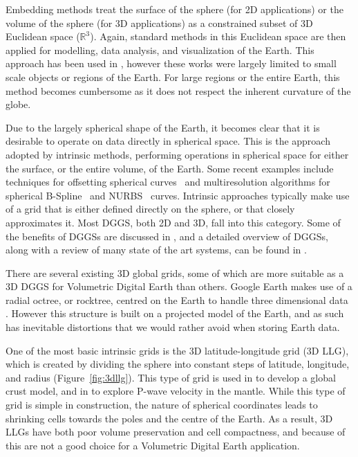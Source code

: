Embedding methods treat the surface of the sphere (for 2D applications) or the volume of the sphere (for 3D applications) as a constrained subset of 3D Euclidean space ($\mathbb{R}^{3}$). Again, standard methods in this Euclidean space are then applied for modelling, data analysis, and visualization of the Earth. This approach has been used in \cite{raskin1994spatial, braun2008douar}, however these works were largely limited to small scale objects or regions of the Earth. For large regions or the entire Earth, this method becomes cumbersome as it does not respect the inherent curvature of the globe.  

Due to the largely spherical shape of the Earth, it becomes clear that it is desirable to operate on data directly in spherical space. This is the approach adopted by intrinsic methods, performing operations in spherical space for either the surface, or the entire volume, of the Earth. Some recent examples include techniques for offsetting spherical curves~\cite{alderson2018offsetting} and multiresolution algorithms for spherical B-Spline~\cite{alderson2016multiresolution} and NURBS~\cite{alderson2019multiscale} curves. Intrinsic approaches typically make use of a grid that is either defined directly on the sphere, or that closely approximates it. Most DGGS, both 2D and 3D, fall into this category. Some of the benefits of DGGSs are discussed in \cite{goodchild2018reimagining}, and a detailed overview of DGGSs, along with a review of many state of the art systems, can be found in \cite{mahdavi2015survey}.

There are several existing 3D global grids, some of which are more suitable as a 3D DGGS for Volumetric Digital Earth than others. Google Earth makes use of a radial octree, or rocktree, centred on the Earth to handle three dimensional data \cite{rohlf2014system}. However this structure is built on a projected model of the Earth, and as such has inevitable distortions that we would rather avoid when storing Earth data.



One of the most basic intrinsic grids is the 3D latitude-longitude grid (3D LLG), which is created by dividing the sphere into constant steps of latitude, longitude, and radius (Figure~\ref{fig:3dllg}). This type of grid is used in \cite{bassin2000current} to develop a global crust model, and in \cite{zhao2004global} to explore P-wave velocity in the mantle. While this type of grid is simple in construction, the nature of spherical coordinates leads to shrinking cells towards the poles and the centre of the Earth. As a result, 3D LLGs have both poor volume preservation and cell compactness, and because of this are not a good choice for a Volumetric Digital Earth application. 

